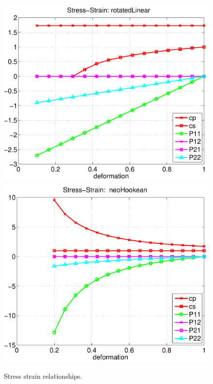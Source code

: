 {\begin{figure}
\begin{center}
  \includegraphics[width=\graphWidth]{fig/rotatedLinearStressStrain}
  \includegraphics[width=\graphWidth]{fig/neoHookeanStressStrain}
  \caption{Stress strain relationships.}
  \label{fig:largeStressStrain}
\end{center}
\end{figure}
}


